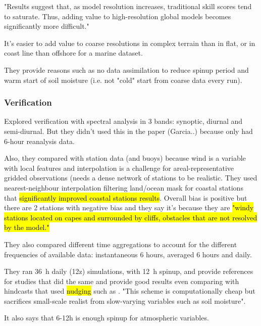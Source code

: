 \documentclass[12pt,a4paper]{article}
\begin{document}
"Results suggest that, as model resolution increases, traditional skill scores tend to saturate. Thus, adding value to high-resolution global models becomes significantly more difficult." 

It's easier to add value to coarse resolutions in complex terrain than in flat, or in coast line than offshore for a marine dataset. 

They provide reasons such as no data assimilation to reduce spinup period and warm start of soil moisture (i.e. not "cold" start from coarse data every run).

\subsubsection{Verification}

Explored verification with spectral analysis in 3 bands: synoptic, diurnal and semi-diurnal. But they didn't used this in the paper (Garcia..) because only had 6-hour reanalysis data.

Also, they compared with station data (and buoys) because wind is a variable with local features and interpolation is a challenge for areal-representative gridded observations (needs a dense network of stations to be realistic. They used nearest-neighbour interpolation filtering land/ocean mask for coastal stations that \hl{significantly improved coastal stations results}. Overall bias is positive but there are 2 stations with negative bias and they say it's because they are \hl{"windy stations located on capes and surrounded by cliffs, obstacles that are not resolved by the model."}

They also compared different time aggregations to account for the different frequencies of available data: instantaneous 6 hours, averaged 6 hours and daily.

They ran 36~h daily (12z) simulations, with 12~h spinup, and provide references for studies that did the same and provide good results even comparing with hindcasts that used \hl{nudging} such as \cite{Menendez2014}. "This scheme is computationally cheap but sacrifices small-scale realist from slow-varying variables such as soil moisture".  

It also says that 6-12h is enough spinup for atmospheric variables.

\subsection{\cite{Vincent2015}}
\end{document}
